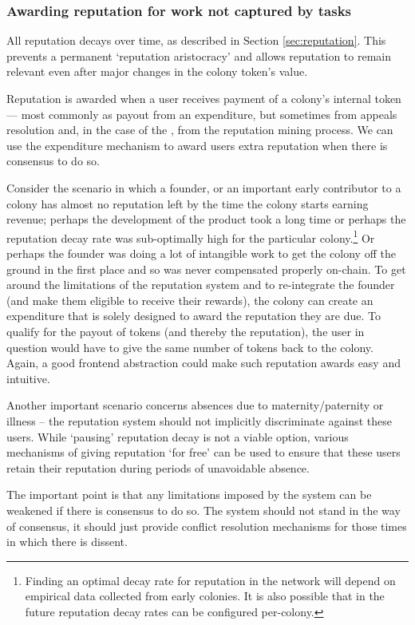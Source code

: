 \subsubsection{Awarding reputation for work not captured by tasks}

All reputation decays over time, as described in Section \ref{sec:reputation}. This prevents a permanent `reputation aristocracy' and allows reputation to remain relevant even after major changes in the colony token's value.

Reputation is awarded when a user receives payment of a colony's internal token --- most commonly as payout from an expenditure, but sometimes from appeals resolution and, in the case of the \rc, from the reputation mining process. We can use the expenditure mechanism to award users extra reputation when there is consensus to do so.

Consider the scenario in which a founder, or an important early contributor to a colony has almost no reputation left by the time the colony starts earning revenue; perhaps the development of the product took a long time or perhaps the reputation decay rate was sub-optimally high for the particular colony.\footnote{Finding an optimal decay rate for reputation in the network will depend on empirical data collected from early colonies. It is also possible that in the future reputation decay rates can be configured per-colony.} Or perhaps the founder was doing a lot of intangible work to get the colony off the ground in the first place and so was never compensated properly on-chain. To get around the limitations of the reputation system and to re-integrate the founder (and make them eligible to receive their rewards), the colony can create an expenditure that is solely designed to award the reputation they are due. To qualify for the payout of tokens (and thereby the reputation), the user in question would have to give the same number of tokens back to the colony. Again, a good frontend abstraction could make such reputation awards easy and intuitive.

Another important scenario concerns absences due to maternity/paternity or illness -- the reputation system should not implicitly discriminate against these users. While `pausing' reputation decay is not a viable option, various mechanisms of giving reputation `for free' can be used to ensure that these users retain their reputation during periods of unavoidable absence.

The important point is that any limitations imposed by the system can be weakened if there is consensus to do so. The system should not stand in the way of consensus, it should just provide conflict resolution mechanisms for those times in which there is dissent.

